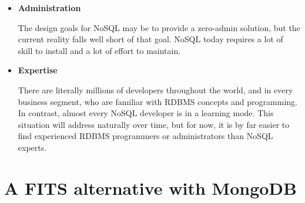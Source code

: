 \begin{itemize}
\item \textbf{Administration}

The design goals for NoSQL may be to provide a zero-admin solution, but the current reality falls well short of that goal. NoSQL today requires a lot of skill to install and a lot of effort to maintain.

\item \textbf{Expertise}

There are literally millions of developers throughout the world, and in every business segment, who are familiar with RDBMS concepts and programming. In contrast, almost every NoSQL developer is in a learning mode. This situation will address naturally over time, but for now, it is by far easier to find experienced RDBMS programmers or administrators than NoSQL experts.

\end{itemize}


\section{A FITS alternative with MongoDB}